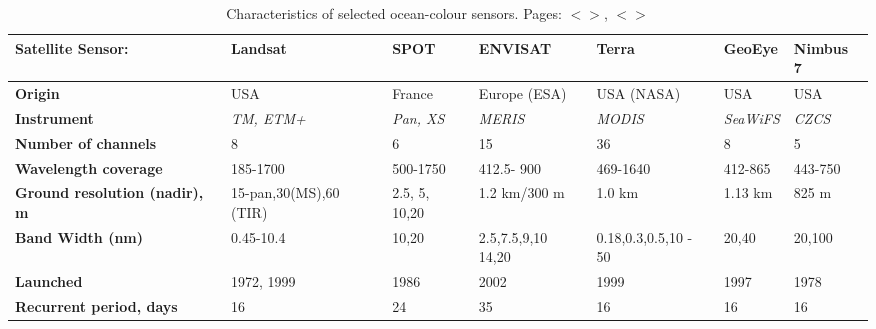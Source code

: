 \documentclass[11pt]{article}
\begin{document}
\begin{table}[htbp]\footnotesize
	\caption{Characteristics of selected ocean-colour sensors. Pages: $<$\pageref{page-intmap}$>$, $<$\pageref{page-47}$>$}
	\begin{center}
		\begin{tabular}{|p{2cm}|p{20mm}|p{15mm}|p{17mm}|p{15mm}|p{15mm}|p{15mm}|}
			\hline\hline
			\textbf{Satellite Sensor:} & {\textbf{Landsat}} & {\textbf{SPOT}} & {\textbf{ENVISAT}} & {\textbf{Terra}} & {\textbf{GeoEye}} & {\textbf{Nimbus 7}} \\ \hline\hline
				\textbf{Origin} & USA & France & Europe (ESA) & USA (NASA) & USA & USA \\ \hline
				\textbf{Instrument} & \textit{TM, ETM+} & \textit{Pan, XS} & \textit{MERIS} & \textit{MODIS} & \textit{SeaWiFS} & \textit{CZCS}\\ \hline
			\textbf{Number of channels} & 8 & 6 & 15 & 36 & 8 & 5 \\ \hline
			\textbf{Wavelength coverage} & 185-1700 & 500-1750 & 412.5- 900 & 469-1640 & 412-865 & 443-750 \\ \hline
			\textbf{Ground resolution (nadir), m} & 15-pan,30(MS),60 (TIR) & 2.5, 5, 10,20 & 1.2 km/300 m & 1.0 km & 1.13 km & 825 m \\ \hline
			\textbf{Band Width (nm)} & 0.45-10.4 & 10,20 & 2.5,7.5,9,10 14,20 & 0.18,0.3,0.5,10 - 50 & 20,40 & 20,100 \\ \hline
			\textbf{Launched} & 1972, 1999 & 1986 & 2002 & 1999 & 1997 & 1978 \\ \hline
			\textbf{Recurrent period, days} & 16 & 24 & 35 & 16 & 16 & 16 \\ \hline
		\end{tabular}
	\end{center}
	\label{tab:1}
\end{table}
\end{document}
